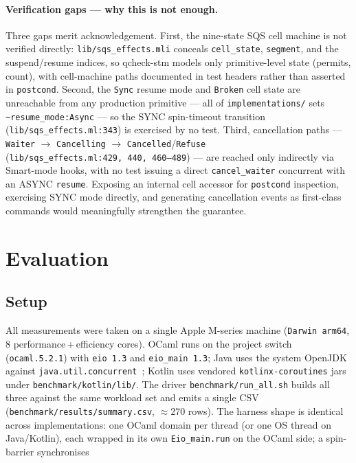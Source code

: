 \documentclass[11pt,a4paper]{article}
\begin{document}
\paragraph{Verification gaps --- why this is not enough.}
\label{sec:tasks-test-gaps}
Three gaps merit acknowledgement. First, the nine-state SQS cell
machine is not verified directly: \texttt{lib/sqs\_effects.mli}
conceals \texttt{cell\_state}, \texttt{segment}, and the
suspend/resume indices, so qcheck-stm models only primitive-level
state (permits, count), with cell-machine paths documented in test
headers rather than asserted in \texttt{postcond}. Second, the
\texttt{Sync} resume mode and \texttt{Broken} cell state are
unreachable from any production primitive --- all of
\texttt{implementations/} sets \texttt{\textasciitilde{}resume\_mode:Async}
--- so the SYNC spin-timeout transition
(\texttt{lib/sqs\_effects.ml:343}) is exercised by no test. Third,
cancellation paths --- \texttt{Waiter} $\to$ \texttt{Cancelling}
$\to$ \texttt{Cancelled}/\texttt{Refuse}
(\texttt{lib/sqs\_effects.ml:429,~440,~460--489}) --- are reached only
indirectly via Smart-mode hooks, with no test issuing a direct
\texttt{cancel\_waiter} concurrent with an ASYNC \texttt{resume}.
Exposing an internal cell accessor for \texttt{postcond} inspection,
exercising SYNC mode directly, and generating cancellation events as
first-class commands would meaningfully strengthen the guarantee.
\section{Evaluation}
\label{sec:evaluation}


\subsection{Setup}
\label{sec:eval-setup}
All measurements were taken on a single Apple M-series machine
(\texttt{Darwin arm64}, 8 performance\,+\,efficiency cores). OCaml runs
on the project switch (\texttt{ocaml.5.2.1}) with \texttt{eio~1.3} and
\texttt{eio\_main~1.3}; Java uses the system OpenJDK against
\texttt{java.util.concurrent}~\cite{lea2005aqs}; Kotlin uses vendored
\texttt{kotlinx-coroutines} jars under \texttt{benchmark/kotlin/lib/}.
The driver \texttt{benchmark/run\_all.sh} builds all three against the
same workload set and emits a single CSV
(\texttt{benchmark/results/summary.csv}, $\approx$270 rows). The harness
shape is identical across implementations: one OCaml domain per thread
(or one OS thread on Java/Kotlin), each wrapped in its own
\texttt{Eio\_main.run} on the OCaml side; a spin-barrier synchronises
\end{document}
